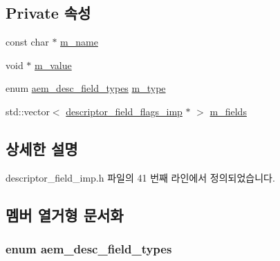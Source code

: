 \subsection*{Private 속성}
\begin{DoxyCompactItemize}
\item 
const char $\ast$ \hyperlink{classavdecc__lib_1_1descriptor__field__imp_aabec0ab061a518c77ba7c2925ad46d44}{m\+\_\+name}
\item 
void $\ast$ \hyperlink{classavdecc__lib_1_1descriptor__field__imp_ad864a5591872b68a638321b3e68b391f}{m\+\_\+value}
\item 
enum \hyperlink{classavdecc__lib_1_1descriptor__field_afcc9e2e668064d50ec69a4f95b154396}{aem\+\_\+desc\+\_\+field\+\_\+types} \hyperlink{classavdecc__lib_1_1descriptor__field__imp_a844fce2d4575b6a8ba713116e57163e3}{m\+\_\+type}
\item 
std\+::vector$<$ \hyperlink{classavdecc__lib_1_1descriptor__field__flags__imp}{descriptor\+\_\+field\+\_\+flags\+\_\+imp} $\ast$ $>$ \hyperlink{classavdecc__lib_1_1descriptor__field__imp_a3edc59da2f7daed82de121c68c5dc06e}{m\+\_\+fields}
\end{DoxyCompactItemize}


\subsection{상세한 설명}


descriptor\+\_\+field\+\_\+imp.\+h 파일의 41 번째 라인에서 정의되었습니다.



\subsection{멤버 열거형 문서화}
\subsubsection[{\texorpdfstring{aem\+\_\+desc\+\_\+field\+\_\+types}{aem_desc_field_types}}]{\setlength{\rightskip}{0pt plus 5cm}enum {\bf aem\+\_\+desc\+\_\+field\+\_\+types}\hspace{0.3cm}{\ttfamily [inherited]}}\hypertarget{classavdecc__lib_1_1descriptor__field_afcc9e2e668064d50ec69a4f95b154396}{}\label{classavdecc__lib_1_1descriptor__field_afcc9e2e668064d50ec69a4f95b154396}


